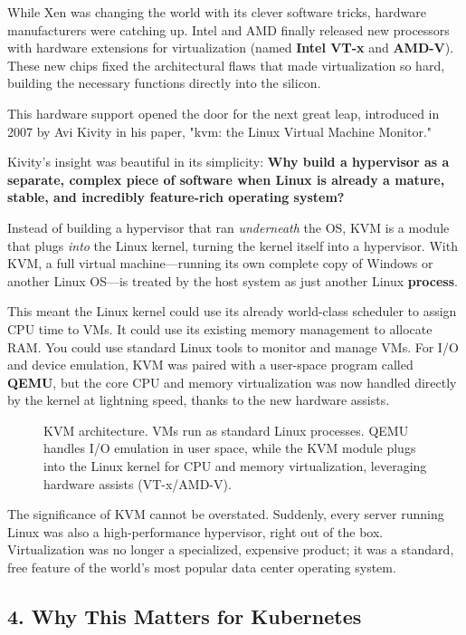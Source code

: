 While Xen was changing the world with its clever software tricks, hardware manufacturers were catching up. Intel and AMD finally released new processors with hardware extensions for virtualization (named \textbf{Intel VT-x} and \textbf{AMD-V}). These new chips fixed the architectural flaws that made virtualization so hard, building the necessary functions directly into the silicon.

This hardware support opened the door for the next great leap, introduced in 2007 by Avi Kivity in his paper, "kvm: the Linux Virtual Machine Monitor."

Kivity's insight was beautiful in its simplicity: \textbf{Why build a hypervisor as a separate, complex piece of software when Linux is already a mature, stable, and incredibly feature-rich operating system?}

Instead of building a hypervisor that ran \textit{underneath} the OS, KVM is a module that plugs \textit{into} the Linux kernel, turning the kernel itself into a hypervisor. With KVM, a full virtual machine---running its own complete copy of Windows or another Linux OS---is treated by the host system as just another Linux \textbf{process}.

This meant the Linux kernel could use its already world-class scheduler to assign CPU time to VMs. It could use its existing memory management to allocate RAM. You could use standard Linux tools to monitor and manage VMs. For I/O and device emulation, KVM was paired with a user-space program called \textbf{QEMU}, but the core CPU and memory virtualization was now handled directly by the kernel at lightning speed, thanks to the new hardware assists.

\begin{figure}[htbp]
\centering

\caption{KVM architecture. VMs run as standard Linux processes. QEMU handles I/O emulation in user space, while the KVM module plugs into the Linux kernel for CPU and memory virtualization, leveraging hardware assists (VT-x/AMD-V).}
\label{fig:3_3}
\end{figure}


The significance of KVM cannot be overstated. Suddenly, every server running Linux was also a high-performance hypervisor, right out of the box. Virtualization was no longer a specialized, expensive product; it was a standard, free feature of the world's most popular data center operating system.


\subsection{4. Why This Matters for Kubernetes}


